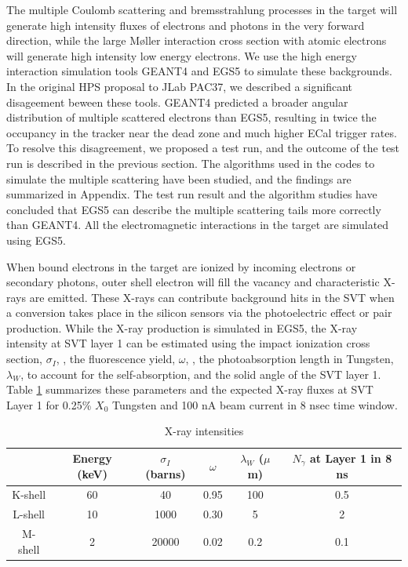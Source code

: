 The multiple Coulomb scattering and bremsstrahlung processes in the target will generate high 
intensity fluxes of electrons and photons in the very forward direction, while the large
M{\o}ller interaction cross section with atomic electrons will generate high intensity low energy
electrons. We use the high energy interaction simulation tools GEANT4 and EGS5 to simulate 
these backgrounds. In the original HPS proposal to JLab PAC37, we described a significant 
disageement beween these tools. GEANT4 predicted a broader angular
distribution of multiple scattered electrons than EGS5, resulting in twice the occupancy in the
tracker near the dead zone and much higher ECal trigger rates. 
To resolve this disagreement, we proposed a test run, and the outcome of the test run is described 
in the previous section. The algorithms used 
in the codes to simulate the multiple scattering have been studied, and the findings are summarized in
Appendix. The test run result and the algorithm studies have concluded that EGS5 can describe the multiple scattering 
tails more correctly than GEANT4. All the electromagnetic interactions in the target are simulated using EGS5.   

When bound electrons in the target are ionized by incoming electrons or secondary photons, outer 
shell electron will fill the vacancy and characteristic X-rays are emitted. 
These X-rays can contribute background hits in
the SVT when a conversion takes place in the silicon sensors via the photoelectric effect 
or pair production. While the X-ray production is simulated in EGS5, the X-ray intensity at SVT layer 1
can be estimated using  the impact ionization 
cross section, $\sigma_I$, \cite{hoffmann}, the fluorescence yield, $\omega$, \cite{hubbell},
the photoabsorption length in Tungsten, $\lambda_W$, to account for the self-absorption, and the solid 
angle of the SVT layer 1.
Table \ref{tab:xray} summarizes these parameters and the expected X-ray
fluxes at SVT Layer 1 for 0.25\% $X_0$ Tungsten and 100 nA beam current in 8 nsec time window. 

\begin{table}[h]
\begin{center}
\begin{tabular}{|c|c|c|c|c|c|} \hline
  & Energy (keV) & $\sigma_I$ (barns) & \hspace{0.5 cm} $\omega$ \hspace{0.5 cm} & $\lambda_W$ ($\mu$m) & $N_\gamma$ at Layer 1 in 8 ns   \\ \hline
K-shell & 60 & 40 & 0.95 & 100 & 0.5 \\ \hline
L-shell  & 10 & 1000 & 0.30 & 5 & 2 \\ \hline
M-shell  & 2 & 20000 & 0.02 & 0.2 & 0.1 \\ \hline
\end{tabular}
\end{center}
\caption{\small{X-ray intensities}}
\label{tab:xray}
\end{table}

